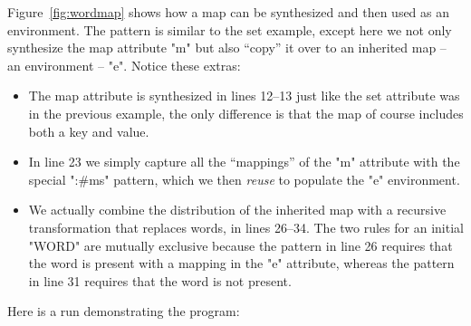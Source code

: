 \documentclass[11pt]{article} %
\begin{document}
\begin{example}\label{ex:wordmap}
  Figure~\ref{fig:wordmap} shows how a map can be synthesized and then used as an environment. The
  pattern is similar to the set example, except here we not only synthesize the map attribute "m"
  but also ``copy'' it over to an inherited map -- an environment -- "e". Notice these extras:
  \begin{itemize}

  \item The map attribute is synthesized in lines 12--13 just like the set attribute was in the
    previous example, the only difference is that the map of course includes both a key and value.

  \item In line 23 we simply capture all the ``mappings'' of the "m" attribute with the special
    ":#ms" pattern, which we then \emph{reuse} to populate the "e" environment.

  \item We actually combine the distribution of the inherited map with a recursive transformation
    that replaces words, in lines 26--34. The two rules for an initial "WORD" are mutually exclusive
    because the pattern in line 26 requires that the word is present with a mapping in the "e"
    attribute, whereas the pattern in line 31 requires that the word is not present.

  \end{itemize}
  Here is a run demonstrating the program:
\end{example}
\end{document}
